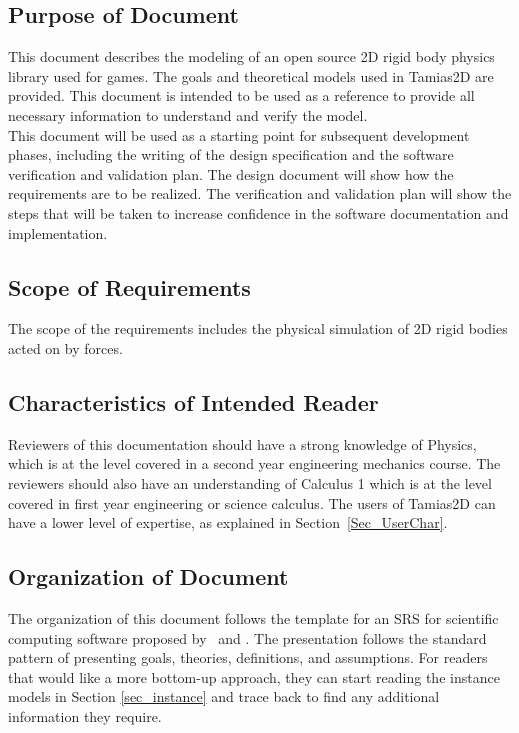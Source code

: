 \documentclass[12pt]{article}
\newcommand{\progname}{Tamias2D}
\begin{document}

\subsection{Purpose of Document}

This document describes the modeling of an open source
2D rigid body physics library used for games. The goals and theoretical
models used in \progname{} are provided. This document is intended to be 
used as a reference to provide all necessary information to understand and verify
the model. \\
\newline
This document will be used as a starting point for subsequent development
phases, including the writing of the design specification and the software verification
and validation plan. The design document will show how the requirements are 
to be realized. The verification and validation plan will show the steps that will 
be taken to increase confidence in the software documentation and 
implementation.

\subsection{Scope of Requirements} 

The scope of the requirements includes the physical simulation of 2D rigid bodies 
acted on by forces. 

\subsection{Characteristics of Intended Reader}
\label{Sec_CharofInteRead}
Reviewers of this documentation should have a strong knowledge of Physics, which
is at the level covered in a second year engineering mechanics course. The
reviewers should also have an understanding of Calculus 1 which is at the level
covered in first year engineering or science calculus. The users of \progname{}
can have a lower level of expertise, as explained in Section~\ref{Sec_UserChar}.

\subsection{Organization of Document}
The organization of this document follows the template for an SRS for scientific
computing software proposed by~\cite{Koothoor2013} and \cite{SmithAndLai2005}.
The presentation follows the standard pattern of presenting goals, theories,
definitions, and assumptions.  For readers that would like a more bottom-up
approach, they can start reading the instance models in Section
\ref{sec_instance} and trace back to find any additional information they
require.
\end{document}
